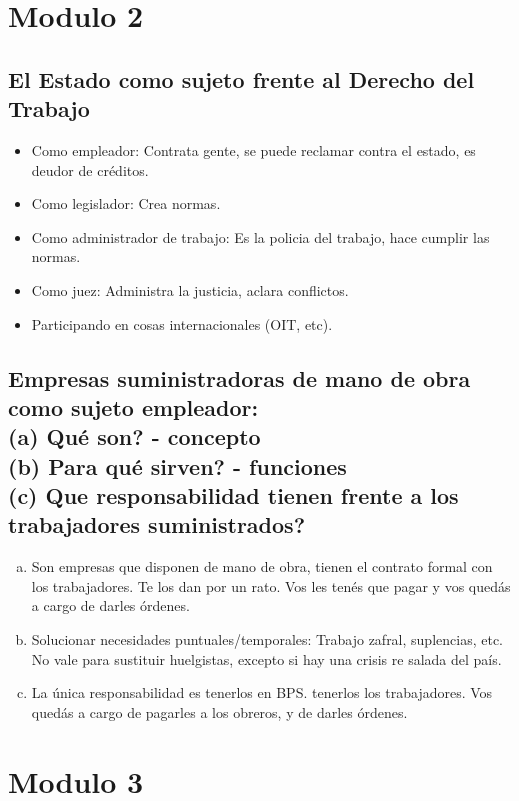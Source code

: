 \documentclass[spanish,12pt,a4paper,titlepage]{report}
\begin{document}
\section{Modulo 2}

\subsection{El Estado como sujeto frente al Derecho del Trabajo}

\begin{itemize}
\item Como empleador:  Contrata gente, se puede reclamar contra el estado, es deudor de créditos.
\item Como legislador: Crea normas.
\item Como administrador de trabajo: Es la policia del trabajo, hace cumplir las normas.
\item Como juez: Administra la justicia, aclara conflictos.
\item Participando en cosas internacionales (OIT, etc).
\end{itemize}

\subsection{Empresas suministradoras de mano de obra como sujeto empleador: \\(a) Qué son? - concepto \\(b) Para qué sirven? - funciones \\(c) Que responsabilidad tienen frente a los trabajadores suministrados?}

\begin{enumerate}[(a)]
\item Son empresas que disponen de mano de obra, tienen el contrato formal con los trabajadores. Te los dan por un rato. Vos les tenés que pagar y vos quedás a cargo de darles órdenes.
\item Solucionar necesidades puntuales/temporales: Trabajo zafral, suplencias, etc. No vale para sustituir huelgistas, excepto si hay una crisis re salada del país.
\item La única responsabilidad es tenerlos en BPS. tenerlos los trabajadores. Vos quedás a cargo de pagarles a los obreros, y de darles órdenes.
\end{enumerate}

\section{Modulo 3}
\end{document}
